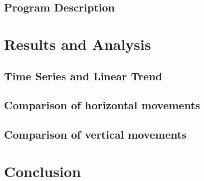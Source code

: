 \documentclass{article}
\begin{document}
\subsection{Program Description}

\section{Results and Analysis}
\subsection{Time Series and Linear Trend}

\subsection{Comparison of horizontal movements}

\subsection{Comparison of vertical movements}

\section{Conclusion}
\end{document}
